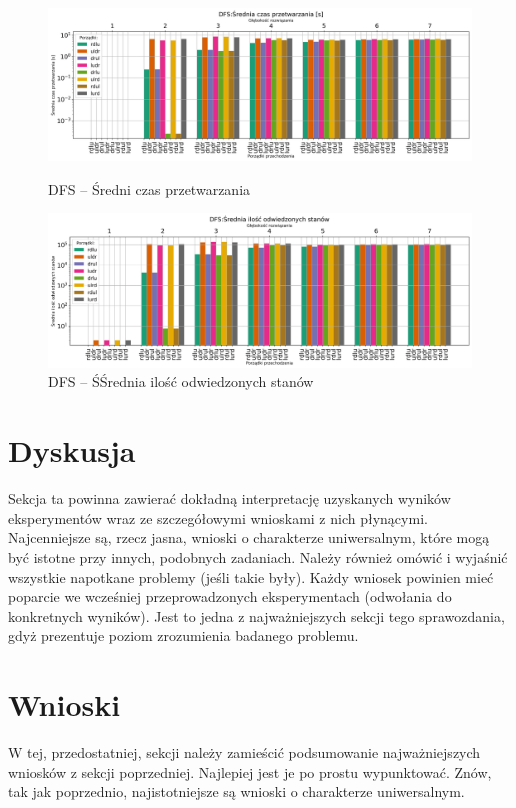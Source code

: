 \documentclass{classrep}
\begin{document}
\begin{figure}[H]
    \includegraphics[width=\textwidth]{charts/DFS_time.png}
    \caption{DFS -- Średni czas przetwarzania}
    \label{DFS:time}
    \includegraphics[width=\textwidth]{charts/DFS_visited.png}
    \caption{DFS -- ŚŚrednia ilość odwiedzonych stanów}
    \label{DFS:visited}
\end{figure}



\restoregeometry

\section{Dyskusja}
{\color{blue}
Sekcja ta powinna zawierać dokładną interpretację uzyskanych wyników
eksperymentów wraz ze szczegółowymi wnioskami z nich płynącymi. Najcenniejsze
są, rzecz jasna, wnioski o charakterze uniwersalnym, które mogą być istotne
przy innych, podobnych zadaniach. Należy również omówić i wyjaśnić wszystkie
napotkane problemy (jeśli takie były). Każdy wniosek powinien mieć poparcie we
wcześniej przeprowadzonych eksperymentach (odwołania do konkretnych wyników).
Jest to jedna z najważniejszych sekcji tego sprawozdania, gdyż prezentuje
poziom zrozumienia badanego problemu.}

\section{Wnioski}
{\color{blue}
W tej, przedostatniej, sekcji należy zamieścić podsumowanie najważniejszych
wniosków z sekcji poprzedniej. Najlepiej jest je po prostu wypunktować. Znów,
tak jak poprzednio, najistotniejsze są wnioski o charakterze uniwersalnym.}
\end{document}

